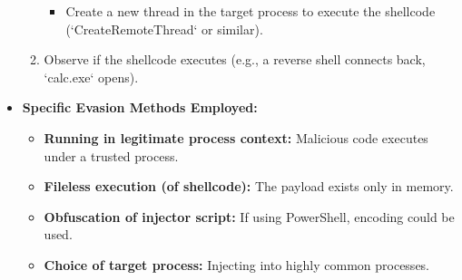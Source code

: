 \documentclass[11pt]{article}
\begin{document}
\begin{itemize}
\begin{enumerate}
\begin{itemize}
				\item Create a new thread in the target process to execute the shellcode (`CreateRemoteThread` or similar).
			\end{itemize}
			\item Observe if the shellcode executes (e.g., a reverse shell connects back, `calc.exe` opens).
		\end{enumerate}
		\item \textbf{Specific Evasion Methods Employed:}
		\begin{itemize}
			\item \textbf{Running in legitimate process context:} Malicious code executes under a trusted process.
			\item \textbf{Fileless execution (of shellcode):} The payload exists only in memory.
			\item \textbf{Obfuscation of injector script:} If using PowerShell, encoding could be used.
			\item \textbf{Choice of target process:} Injecting into highly common processes.
		\end{itemize}
	\end{itemize}
	
\end{document}
